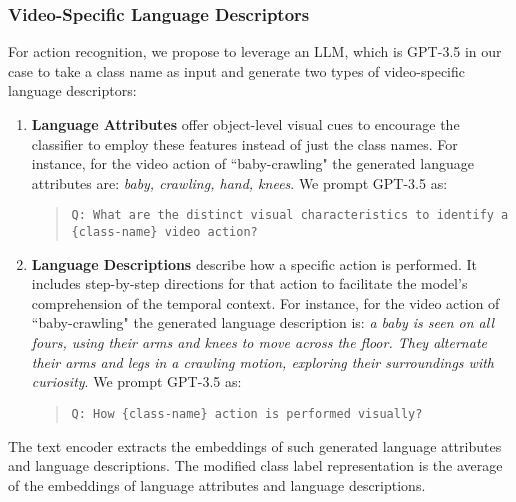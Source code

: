 \documentclass{article} \usepackage{iclr2024_conference,times}
\begin{document}
\subsubsection{Video-Specific Language Descriptors}
\label{subsubsec:Video-Specific Language Descriptors}
For action recognition, we propose to leverage an LLM, which is GPT-3.5 in our case \citep{brown2020language} to take a class name as input and generate two types of video-specific language descriptors: 
\begin{enumerate}
    \item  \textbf{Language Attributes} offer object-level visual cues to encourage the classifier to employ these features instead of just the class names. For instance, for the video action of ``baby-crawling" the generated language attributes are: \emph{baby, crawling, hand, knees}. We prompt GPT-3.5 as:
     \begin{quotation}
\centering \begin{minipage}{0.9\linewidth} {\texttt{Q: What are the distinct visual characteristics to identify a {\{class-name}\} video action?}} 
    \newline
    
\end{minipage}
\end{quotation}
   
    \item  \textbf{Language Descriptions} describe how a specific action is performed. It includes step-by-step directions for that action to facilitate the model's comprehension of the temporal context. For instance, for the video action of ``baby-crawling" the generated language description is: \emph{a baby is seen on all fours, using their arms and knees to move across the floor. They alternate their arms and legs in a crawling motion, exploring their surroundings with curiosity}. We prompt GPT-3.5 as:
     \begin{quotation}
\centering \begin{minipage}{0.9\linewidth} {\texttt{Q: How {\{class-name}\} action is performed visually? }} 
\end{minipage}
\end{quotation}
    
\end{enumerate}

The text encoder  extracts the embeddings of such generated language attributes and language descriptions. The modified class label representation   is the average of the embeddings of language attributes and language descriptions.
\end{document}
